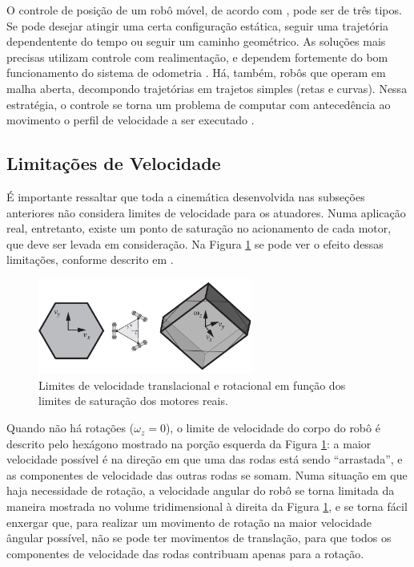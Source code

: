 O controle de posição de um robô móvel, de acordo com \citet{siegwart2011introduction}, pode ser de três tipos. Se pode desejar atingir uma certa configuração estática, seguir uma trajetória dependentente do tempo ou seguir um caminho geométrico. As soluções mais precisas utilizam controle com realimentação, e dependem fortemente do bom funcionamento do sistema de odometria \citep{samani2007comprehensive}. Há, também, robôs que operam em malha aberta, decompondo trajetórias em trajetos simples (retas e curvas). Nessa estratégia, o controle se torna um problema de computar com antecedência ao movimento o perfil de velocidade a ser executado \citep{siegwart2011introduction}.

\subsection{Limitações de Velocidade}

É importante ressaltar que toda a cinemática desenvolvida nas subseções anteriores não considera limites de velocidade para os atuadores. Numa aplicação real, entretanto, existe um ponto de saturação no acionamento de cada motor, que deve ser levada em consideração. Na Figura \ref{fig:twist_sat} se pode ver o efeito dessas limitações, conforme descrito em \citet{lynch2017modern}.

\begin{figure}[h]
  \centering
  \includegraphics[width = 0.63\textwidth]{imagens/twist_sat}
  \caption{Limites de velocidade translacional e rotacional em função dos limites de saturação dos motores reais.}
  \label{fig:twist_sat}
\end{figure}

Quando não há rotações ($\omega_z = 0$), o limite de velocidade do corpo do robô é descrito pelo hexágono mostrado na porção esquerda da Figura \ref{fig:twist_sat}: a maior velocidade possível é na direção em que uma das rodas está sendo ``arrastada'', e as componentes de velocidade das outras rodas se somam. Numa situação em que haja necessidade de rotação, a velocidade angular do robô se torna limitada da maneira mostrada no volume tridimensional à direita da Figura \ref{fig:twist_sat}, e se torna fácil enxergar que, para realizar um movimento de rotação na maior velocidade ângular possível, não se pode ter movimentos de translação, para que todos os componentes de velocidade das rodas contribuam apenas para a rotação.

